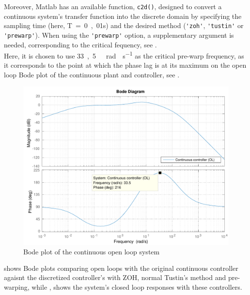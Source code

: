 Moreover, Matlab has an available function, \lstinline{c2d()}, designed to convert a continuous system's transfer function into the discrete domain by specifying the sampling time (here, \si{T = 0,01s}) and the desired method (\lstinline{'zoh'}, \lstinline{'tustin'} or \lstinline{'prewarp'}). When using the \lstinline{'prewarp'} option, a supplementary argument is needed, corresponding to the critical fequency, see \cite{Matlabc2d}.\\
Here, it is chosen to use \si{33,5\ rad \cdot s^{-1}} as the critical pre-warp frequency, as it corresponds to the point at which the phase lag is at its maximum on the open loop Bode plot of the continuous plant and controller, see .
%
\begin{figure}[H]
  \centering
  \includegraphics[scale=0.55]{figures/openLoopBadSISOController.pdf}
  \caption{Bode plot of the continuous open loop system}
  \label{fig:bodeOpenLoopContinuous}
\end{figure}
%
 shows Bode plots comparing open loops with the original continuous controller agaisnt the discretized controller's with ZOH, normal Tustin's method and pre-warping, while , shows the system's closed loop responses with these controllers.\\ 
%
